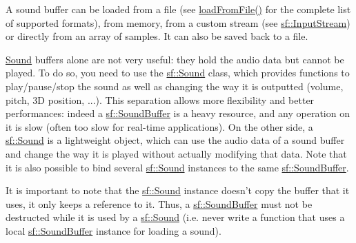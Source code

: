 A sound buffer can be loaded from a file (see \hyperlink{classsf_1_1_sound_buffer_a2be6a8025c97eb622a7dff6cf2594394}{load\-From\-File()} for the complete list of supported formats), from memory, from a custom stream (see \hyperlink{classsf_1_1_input_stream}{sf\-::\-Input\-Stream}) or directly from an array of samples. It can also be saved back to a file.

\hyperlink{classsf_1_1_sound}{Sound} buffers alone are not very useful\-: they hold the audio data but cannot be played. To do so, you need to use the \hyperlink{classsf_1_1_sound}{sf\-::\-Sound} class, which provides functions to play/pause/stop the sound as well as changing the way it is outputted (volume, pitch, 3\-D position, ...). This separation allows more flexibility and better performances\-: indeed a \hyperlink{classsf_1_1_sound_buffer}{sf\-::\-Sound\-Buffer} is a heavy resource, and any operation on it is slow (often too slow for real-\/time applications). On the other side, a \hyperlink{classsf_1_1_sound}{sf\-::\-Sound} is a lightweight object, which can use the audio data of a sound buffer and change the way it is played without actually modifying that data. Note that it is also possible to bind several \hyperlink{classsf_1_1_sound}{sf\-::\-Sound} instances to the same \hyperlink{classsf_1_1_sound_buffer}{sf\-::\-Sound\-Buffer}.

It is important to note that the \hyperlink{classsf_1_1_sound}{sf\-::\-Sound} instance doesn't copy the buffer that it uses, it only keeps a reference to it. Thus, a \hyperlink{classsf_1_1_sound_buffer}{sf\-::\-Sound\-Buffer} must not be destructed while it is used by a \hyperlink{classsf_1_1_sound}{sf\-::\-Sound} (i.\-e. never write a function that uses a local \hyperlink{classsf_1_1_sound_buffer}{sf\-::\-Sound\-Buffer} instance for loading a sound).

